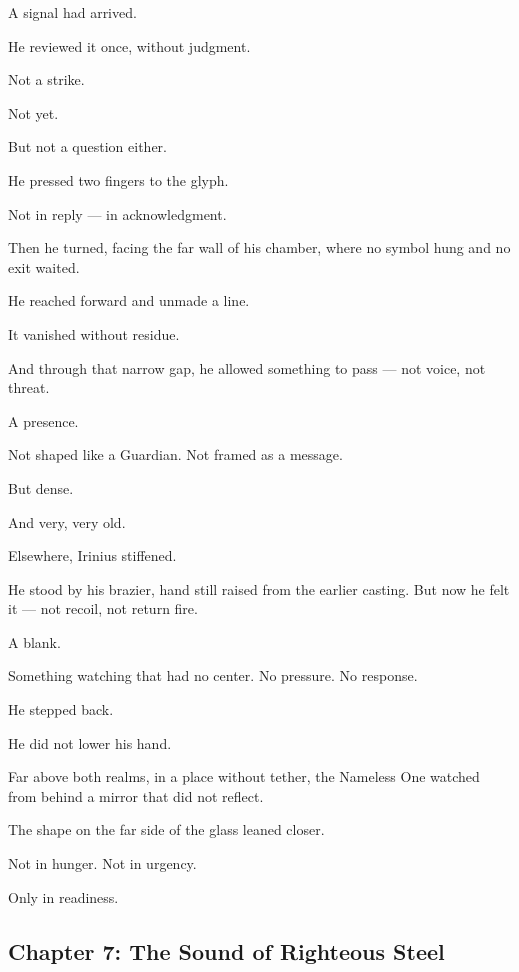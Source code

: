 \documentclass[9pt]{article}
\begin{document}
A signal had arrived.

He reviewed it once, without judgment.

Not a strike.

Not yet.

But not a question either.

He pressed two fingers to the glyph.

Not in reply — in acknowledgment.

Then he turned, facing the far wall of his chamber, where no symbol hung and no exit waited.

He reached forward and unmade a line.

It vanished without residue.

And through that narrow gap, he allowed something to pass — not voice, not threat.

A presence.

Not shaped like a Guardian. Not framed as a message.

But dense.

And very, very old.

Elsewhere, Irinius stiffened.

He stood by his brazier, hand still raised from the earlier casting. But now he felt it — not recoil, not return fire.

A blank.

Something watching that had no center. No pressure. No response.

He stepped back.

He did not lower his hand.

Far above both realms, in a place without tether, the Nameless One watched from behind a mirror that did not reflect.

The shape on the far side of the glass leaned closer.

Not in hunger. Not in urgency.

Only in readiness.

\newpage

\subsection*{Chapter 7: The Sound of Righteous Steel}

\vspace{1in}
\end{document}
